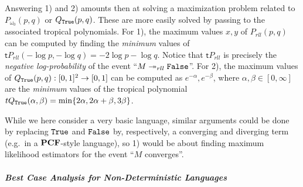 Answering 1) and 2) amounts then at solving a maximization problem related to $P_{\omega_{0}}(p,q)$ or $Q_{\mathtt{True}}(p,q)$. These are more easily solved by passing to the associated tropical polynomials.
For 1), the maximum values $x,y$ of $P_{rll}(p,q)$ can be computed by finding the \emph{minimum} values of $\mathsf tP_{rll}(-\log p, -\log q)= -2\log p- \log q$. Notice that $\mathsf tP_{rll}$ is precisely the \emph{negative log-probability} of the event ``$M\twoheadrightarrow_{rll} \mathtt{False}$''. For 2), the maximum values of $Q_{\mathtt{True}}(p,q): [0,1]^{2}\to [0,1]$ can be computed as $e^{-\alpha},e^{-\beta}$, where $\alpha,\beta\in[0,\infty]$ are the \emph{minimum} values of the tropical polynomial 
$\mathsf t Q_{\true}(\alpha,\beta) = \min \{ 2\alpha, 2\alpha+\beta, 3\beta\}$.




While we here consider a very basic language, similar arguments could be done by replacing $\mathtt{True}$ and $\mathtt{False}$ by, respectively, a converging and diverging term (e.g.~in a $\mathbf{PCF}$-style language), so 1) would be about finding maximum likelihood estimators for the event ``$M$ converges''.


\subparagraph*{Best Case Analysis for Non-Deterministic Languages}


